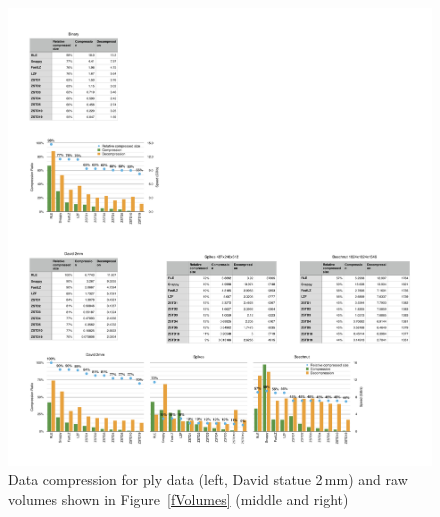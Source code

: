 \documentclass[10pt,journal,compsoc]{IEEEtran}
\newcommand{\fig}[1]{Figure~\ref{#1}}
\begin{document}
\begin{figure}[ht]\center
  \includegraphics[width=\textwidth]{images/compressorDetail}
  \caption{\label{fCompressorDetail}Data compression for ply data (left, David
    statue 2\,mm) and raw volumes shown in \fig{fVolumes} (middle and right)}
\end{figure}
\end{document}
